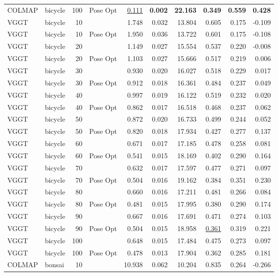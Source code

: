 \begin{table}[H]
\begin{tabular}{llrlrrrrrr}
COLMAP & bicycle & 100 & Pose Opt & \underline{0.111} & \textbf{0.002} & \textbf{22.163} & \textbf{0.349} & \textbf{0.559} & \textbf{0.428} \\
VGGT & bicycle & 10 &  & 1.748 & 0.032 & 13.804 & 0.605 & 0.175 & -0.109 \\
VGGT & bicycle & 10 & Pose Opt & 1.950 & 0.036 & 13.722 & 0.601 & 0.175 & -0.108 \\
VGGT & bicycle & 20 &  & 1.149 & 0.027 & 15.554 & 0.537 & 0.220 & -0.008 \\
VGGT & bicycle & 20 & Pose Opt & 1.103 & 0.027 & 15.666 & 0.517 & 0.219 & 0.006 \\
VGGT & bicycle & 30 &  & 0.930 & 0.020 & 16.027 & 0.518 & 0.229 & 0.017 \\
VGGT & bicycle & 30 & Pose Opt & 0.912 & 0.018 & 16.361 & 0.484 & 0.237 & 0.049 \\
VGGT & bicycle & 40 &  & 0.997 & 0.019 & 16.122 & 0.519 & 0.232 & 0.020 \\
VGGT & bicycle & 40 & Pose Opt & 0.862 & 0.017 & 16.518 & 0.468 & 0.237 & 0.062 \\
VGGT & bicycle & 50 &  & 0.872 & 0.020 & 16.733 & 0.499 & 0.244 & 0.052 \\
VGGT & bicycle & 50 & Pose Opt & 0.820 & 0.018 & 17.934 & 0.427 & 0.277 & 0.137 \\
VGGT & bicycle & 60 &  & 0.671 & 0.017 & 17.185 & 0.478 & 0.258 & 0.081 \\
VGGT & bicycle & 60 & Pose Opt & 0.541 & 0.015 & 18.169 & 0.402 & 0.290 & 0.164 \\
VGGT & bicycle & 70 &  & 0.632 & 0.017 & 17.597 & 0.477 & 0.271 & 0.097 \\
VGGT & bicycle & 70 & Pose Opt & 0.504 & 0.016 & 19.162 & 0.384 & 0.351 & 0.230 \\
VGGT & bicycle & 80 &  & 0.660 & 0.016 & 17.211 & 0.481 & 0.266 & 0.084 \\
VGGT & bicycle & 80 & Pose Opt & 0.481 & 0.015 & 17.995 & 0.380 & 0.290 & 0.174 \\
VGGT & bicycle & 90 &  & 0.667 & 0.016 & 17.691 & 0.471 & 0.274 & 0.103 \\
VGGT & bicycle & 90 & Pose Opt & 0.504 & 0.015 & 18.958 & \underline{0.361} & 0.319 & 0.221 \\
VGGT & bicycle & 100 &  & 0.648 & 0.015 & 17.484 & 0.475 & 0.273 & 0.097 \\
VGGT & bicycle & 100 & Pose Opt & 0.478 & 0.013 & 17.904 & 0.362 & 0.285 & 0.181 \\
\midrule
COLMAP & bonsai & 10 &  & 10.938 & 0.062 & 10.204 & 0.835 & 0.264 & -0.266 \\

\end{tabular}
\end{table}
